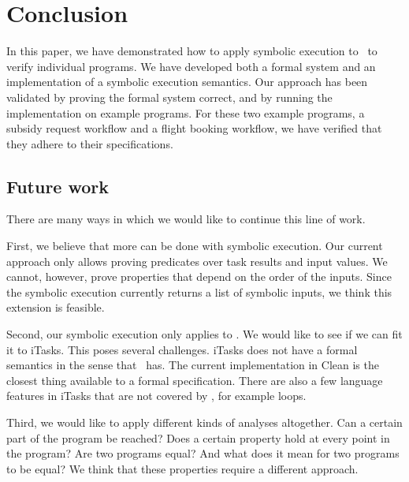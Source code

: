 
\section{Conclusion}

\label{sec:conclusion}

In this paper, we have demonstrated how to apply symbolic execution to \TOPHAT\ to verify individual programs.
We have developed both a formal system and an implementation of a symbolic execution semantics.
Our approach has been validated by proving the formal system correct, and by running the implementation on example programs.
For these two example programs, a subsidy request workflow and a flight booking workflow, we have verified that they adhere to their specifications.


\subsection{Future work}

There are many ways in which we would like to continue this line of work.

First, we believe that more can be done with symbolic execution.
Our current approach only allows proving predicates over task results and input values.
We cannot, however, prove properties that depend on the order of the inputs.
Since the symbolic execution currently returns a list of symbolic inputs, we think this extension is feasible.

Second, our symbolic execution only applies to \TOPHAT.
We would like to see if we can fit it to iTasks.
This poses several challenges.
iTasks does not have a formal semantics in the sense that \TOPHAT\ has.
The current implementation in Clean is the closest thing available to a formal specification.
There are also a few language features in iTasks that are not covered by \TOPHAT, for example loops.

Third, we would like to apply different kinds of analyses altogether.
Can a certain part of the program be reached?
Does a certain property hold at every point in the program?
Are two programs equal? And what does it mean for two programs to be equal?
We think that these properties require a different approach.
